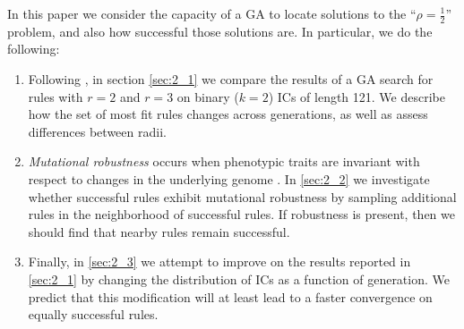In this paper we consider the capacity of a GA to locate solutions to the ``$\rho = \frac{1}{2}$'' problem, and also how successful those solutions are. In particular, we do the following: 
\begin{enumerate}
	\item Following \cite{Mitchell:1994:ECA:186092.186116}, in section \ref{sec:2_1} we compare the results of a GA search for rules with $r = 2$ and $r = 3$ on binary ($k = 2$) 
	ICs of length 121. We describe how the set of most fit rules changes across generations, as well as assess differences between radii.
	\item \textit{Mutational robustness} occurs when phenotypic traits are invariant with respect to changes in the underlying genome \cite{wagner_role_2012}.  
	In \ref{sec:2_2} we investigate whether successful rules exhibit mutational robustness by sampling additional rules in the neighborhood of successful rules. If robustness is present, then we should find that nearby rules remain successful.
	\item Finally, in \ref{sec:2_3} we attempt to improve on the results reported in \ref{sec:2_1} by changing the distribution of ICs as a function of generation. We predict that this modification will at least lead to a faster convergence on equally successful rules.
\end{enumerate}








